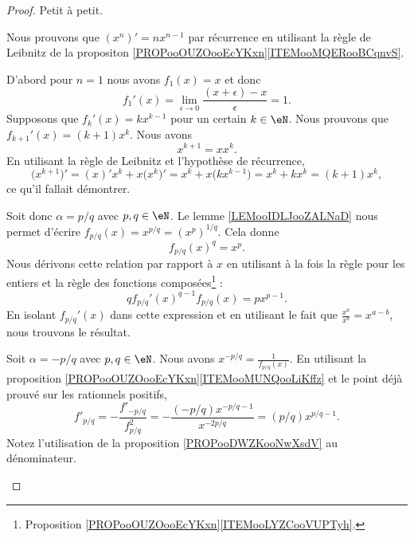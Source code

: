 \begin{proof}
	Petit à petit.
	\begin{subproof}
		\spitem[Naturel]
		Nous prouvons que \( (x^n)'=nx^{n-1}\) par récurrence en utilisant la règle de Leibnitz de la propositon  \ref{PROPooOUZOooEcYKxn}\ref{ITEMooMQERooBCqnvS}.

		D'abord pour \( n=1\) nous avons \( f_1(x)=x\) et donc
		\begin{equation}
			f_1'(x)=\lim_{\epsilon\to 0}\frac{ (x+\epsilon)-x }{ \epsilon }=1.
		\end{equation}
		Supposons que \( f_k'(x)=kx^{k-1}\) pour un certain \( k\in \eN\). Nous prouvons que \( f_{k+1}'(x)=(k+1)x^{k}\).  Nous avons
		\begin{equation}
			x^{k+1}=xx^k.
		\end{equation}
		En utilisant la règle de Leibnitz et l'hypothèse de récurrence,
		\begin{equation}
			\big( x^{k+1} \big)'=(x)'x^k+x\big( x^k \big)'
			=x^k+x\big( kx^{k-1} \big)
			=x^k+kx^k
			=(k+1)x^k,
		\end{equation}
		ce qu'il fallait démontrer.

		Soit donc \( \alpha=p/q\) avec \( p,q\in \eN\). Le lemme \ref{LEMooIDLJooZALNaD} nous permet d'écrire \( f_{p/q}(x)=x^{p/q}=(x^p)^{1/q}\). Cela donne
		\begin{equation}
			f_{p/q}(x)^q=x^p.
		\end{equation}
		Nous dérivons cette relation par rapport à \( x\) en utilisant à la fois la règle pour les entiers et la règle des fonctions composées\footnote{Proposition \ref{PROPooOUZOooEcYKxn}\ref{ITEMooLYZCooVUPTyh}.} :
		\begin{equation}
			qf_{p/q}'(x)^{q-1}f_{p/q}(x)=px^{p-1}.
		\end{equation}
		En isolant \( f_{p/q}'(x)\) dans cette expression et en utilisant le fait que \( \frac{ x^a }{ x^b }=x^{a-b}\), nous trouvons le résultat.


		Soit \( \alpha=-p/q\) avec \( p,q\in \eN\). Nous avons \( x^{-p/q}=\frac{1}{ f_{p/q}(x) }\). En utilisant la proposition \ref{PROPooOUZOooEcYKxn}\ref{ITEMooMUNQooLiKffz} et le point déjà prouvé sur les rationnels positifs,
		\begin{equation}
			f'_{p/q}=-\frac{ f'_{-p/q} }{ f_{p/q}^2 }=-\frac{ (-p/q)x^{-p/q-1} }{ x^{-2p/q} }=(p/q)x^{p/q-1}.
		\end{equation}
		Notez l'utilisation de la proposition \ref{PROPooDWZKooNwXsdV} au dénominateur.


\end{subproof}
\end{proof}
